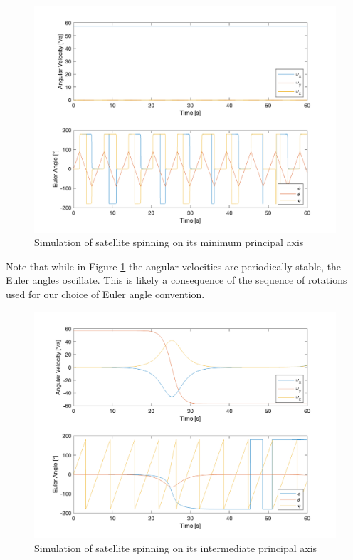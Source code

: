 \begin{figure}[H]
\centering
\includegraphics[scale=0.6]{Images/ps4_problem2a_1.png}
\caption{Simulation of satellite spinning on its minimum principal axis}
\label{fig:ps4_problem2a_1}
\end{figure}

Note that while in Figure \ref{fig:ps4_problem2a_1} the angular velocities are periodically stable, the Euler angles oscillate. This is likely a consequence of the sequence of rotations used for our choice of Euler angle convention.

\begin{figure}[H]
\centering
\includegraphics[scale=0.6]{Images/ps4_problem2a_2.png}
\caption{Simulation of satellite spinning on its intermediate principal axis}
\label{fig:ps4_problem2a_2}
\end{figure}

